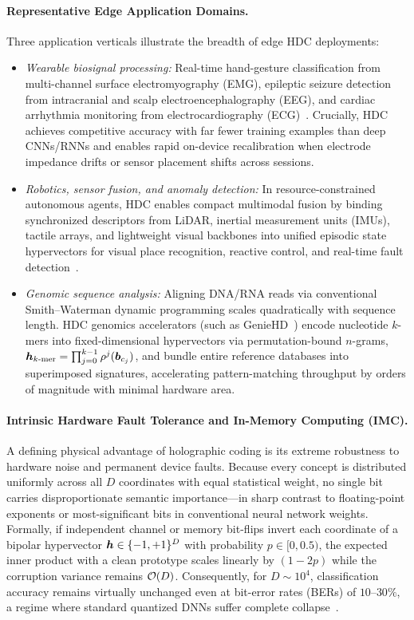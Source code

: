 \paragraph{Representative Edge Application Domains.}
Three application verticals illustrate the breadth of edge HDC deployments:
\begin{itemize}
    \item \emph{Wearable biosignal processing:} Real-time hand-gesture classification from multi-channel surface electromyography (EMG), epileptic seizure detection from intracranial and scalp electroencephalography (EEG), and cardiac arrhythmia monitoring from electrocardiography (ECG)~\cite{RAHIMI_HDC_EDGE}. Crucially, HDC achieves competitive accuracy with far fewer training examples than deep CNNs/RNNs and enables rapid on-device recalibration when electrode impedance drifts or sensor placement shifts across sessions.
    \item \emph{Robotics, sensor fusion, and anomaly detection:} In resource-constrained autonomous agents, HDC enables compact multimodal fusion by binding synchronized descriptors from LiDAR, inertial measurement units (IMUs), tactile arrays, and lightweight visual backbones into unified episodic state hypervectors for visual place recognition, reactive control, and real-time fault detection~\cite{NEUBERT_2019_HDC_ROBOTICS}.
    \item \emph{Genomic sequence analysis:} Aligning DNA/RNA reads via conventional Smith--Waterman dynamic programming scales quadratically with sequence length. HDC genomics accelerators (such as GenieHD~\cite{KIM_2020_GENIEHD}) encode nucleotide $k$-mers into fixed-dimensional hypervectors via permutation-bound $n$-grams, $\boldsymbol{h}_{k\text{-mer}} = \prod_{j=0}^{k-1} \rho^j(\boldsymbol{b}_{c_j})$, and bundle entire reference databases into superimposed signatures, accelerating pattern-matching throughput by orders of magnitude with minimal hardware area.
\end{itemize}

\paragraph{Intrinsic Hardware Fault Tolerance and In-Memory Computing (IMC).}
A defining physical advantage of holographic coding is its extreme robustness to hardware noise and permanent device faults.
Because every concept is distributed uniformly across all $D$ coordinates with equal statistical weight, no single bit carries disproportionate semantic importance---in sharp contrast to floating-point exponents or most-significant bits in conventional neural network weights.
Formally, if independent channel or memory bit-flips invert each coordinate of a bipolar hypervector $\boldsymbol{h} \in \{-1,+1\}^D$ with probability $p \in [0, 0.5)$, the expected inner product with a clean prototype scales linearly by $(1 - 2p)$ while the corruption variance remains $\mathcal{O}\!\left(D\right)$.
Consequently, for $D \sim 10^4$, classification accuracy remains virtually unchanged even at bit-error rates (BERs) of $10\text{--}30\%$, a regime where standard quantized DNNs suffer complete collapse~\cite{RAHIMI_HDC_EDGE,KARUNARATNE_2020_PCM_HDC}.


